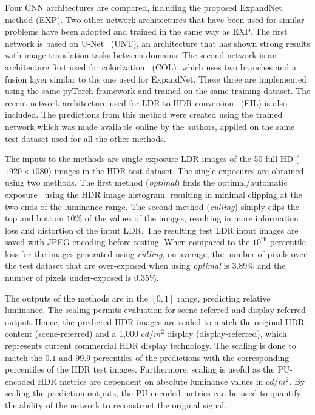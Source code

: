 \documentclass{egpubl}
\begin{document}
Four CNN architectures are compared, including the proposed ExpandNet method
(EXP). Two other network architectures that have been used for
similar problems have been adopted and trained in the same way as EXP. The first
network is based on U-Net~\cite{ronneberger2015unet} (UNT), an architecture
that has shown strong results with image translation tasks between domains. The
second network is an architecture first used for
colorization~\cite{iizuka2016colornet} (COL), which uses two branches and a
fusion layer similar to the one used for ExpandNet. These three are implemented
using the same pyTorch framework and trained on the same training dataset. The
recent network architecture used for LDR to HDR
conversion~\cite{eilertsen2017cnn} (EIL) is also included. The predictions
from this method were created using the trained network which was made
available online by the authors, applied on the same test dataset used for all
the other methods.

The inputs to the methods are single exposure LDR images of the 50 full HD
($1920 \times 1080$) images in the HDR test dataset. The single exposures are
obtained using two methods. The first method (\textit{optimal}) finds the
optimal/automatic exposure~\cite{debattista2015optimal} using the HDR image
histogram, resulting in minimal clipping at the two ends of the luminance
range. The second method (\textit{culling}) simply clips the top and bottom
$10\%$ of the values of the images, resulting in more information loss and
distortion of the input LDR. The resulting test LDR input images are saved with
JPEG encoding before testing. When compared to the $10^{\text{th}}$ percentile
loss for the images generated using \textit{culling}, on average, the number of
pixels over the test dataset that are over-exposed when using \textit{optimal}
is 3.89\% and the number of pixels under-exposed is 0.35\%.

The outputs of the methods are in the $[0, 1]$ range, predicting relative
luminance. The scaling permits evaluation for scene-referred and
display-referred output. Hence, the predicted HDR images are scaled to match
the original HDR content (scene-referred) and a 1,000 $cd/m^2$ display
(display-referred), which represents current commercial HDR display technology.
The scaling is done to match the $0.1$ and $99.9$ percentiles of the
predictions with the corresponding percentiles of the HDR test images.
Furthermore, scaling is useful as the PU-encoded HDR metrics are dependent on
absolute luminance values in $cd/m^2$. By scaling the prediction outputs, the
PU-encoded metrics can be used to quantify the ability of the network to
reconstruct the original signal.
\end{document}

